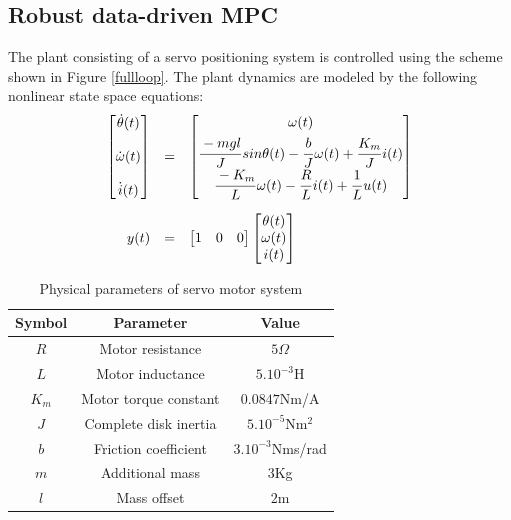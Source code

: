 \documentclass[letterpaper, 10 pt, conference]{ieeeconf}  %
\begin{document}
	\subsection{Robust data-driven MPC }
	The plant consisting of a servo positioning system is controlled using the scheme shown in Figure \ref{fullloop}. The plant dynamics are modeled by the following nonlinear state space equations:
	\begin{equation*}
	\small
	\begin{array}{rcl}
	\begin{bmatrix}
	\dot{\theta}(t) \vspace{12pt} \\
	\dot{\omega}(t) \vspace{12pt} \\
	\dot{i}(t)
	\end{bmatrix} &=& 
	\begin{bmatrix}
	\omega(t) \vspace{3pt}\\
	\cfrac{-mgl}{J}\hspace{1pt}sin\theta(t)-\cfrac{b}{J}\hspace{1pt}\omega(t) + \cfrac{K_m}{J}\hspace{1pt}i(t) \\  
	\cfrac{-K_m}{L}\hspace{1pt}\omega(t)-\cfrac{R}{L}\hspace{1pt}i(t) + \cfrac{1}{L}\hspace{1pt}u(t)
	\end{bmatrix} \vspace{10pt}\\
	y(t) &=& \begin{bmatrix} 1 & 0 & 0 \end{bmatrix} 
	\begin{bmatrix} \theta(t) \\ \omega(t) \\ i(t) \end{bmatrix} 
	\end{array}
	\end{equation*}
	\begin{table}[h!]
		\hspace{30pt}
		\begin{tabular}{||c|c|c||} 
			\hline
			Symbol & Parameter & Value\\ [0.5ex] 
			\hline\hline
			$R$ & Motor resistance & $5\Omega$ \\ 
			$L$ & Motor inductance & $5.10^{-3}$H \\
			$K_m$ & Motor torque constant & $0.0847$Nm/A \\
			$J$ & Complete disk inertia & $5.10^{-5}$Nm$^2$ \\
			$b$ & Friction coefficient & $3.10^{-3}$Nms/rad \\
			$m$ & Additional mass & $3$Kg \\
			$l$ & Mass offset & $2$m \\
			\hline
		\end{tabular}
		\caption{Physical parameters of servo motor system}
		\label{Simparam}
		\vspace{-10pt}  
	\end{table}
\end{document}
